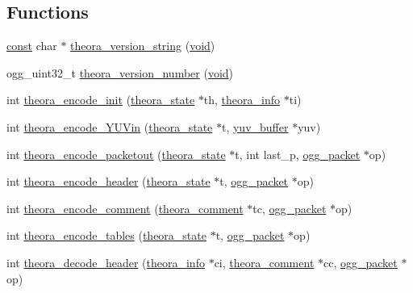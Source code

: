 \subsection*{Functions}
\begin{DoxyCompactItemize}
\item 
\hyperlink{zconf_8h_a2c212835823e3c54a8ab6d95c652660e}{const} char $\ast$ \hyperlink{group__oldfuncs_ga5a3da8fd262a60f055f96536eec06df2}{theora\+\_\+version\+\_\+string} (\hyperlink{png_8h_ac9c84fa68bbad002983e35ce3663c686}{void})
\item 
ogg\+\_\+uint32\+\_\+t \hyperlink{group__oldfuncs_gad181f4b19d455dcc2bef2533530b84c8}{theora\+\_\+version\+\_\+number} (\hyperlink{png_8h_ac9c84fa68bbad002983e35ce3663c686}{void})
\item 
int \hyperlink{group__oldfuncs_ga0f7ad4d4b2343278cb4ba8fb2bd5109a}{theora\+\_\+encode\+\_\+init} (\hyperlink{structtheora__state}{theora\+\_\+state} $\ast$th, \hyperlink{structtheora__info}{theora\+\_\+info} $\ast$ti)
\item 
int \hyperlink{group__oldfuncs_gac0d33d896ca70cedfc94c5986d947078}{theora\+\_\+encode\+\_\+\+Y\+U\+Vin} (\hyperlink{structtheora__state}{theora\+\_\+state} $\ast$t, \hyperlink{structyuv__buffer}{yuv\+\_\+buffer} $\ast$yuv)
\item 
int \hyperlink{group__oldfuncs_ga5f4929677a735bc2198c2309d235f1b3}{theora\+\_\+encode\+\_\+packetout} (\hyperlink{structtheora__state}{theora\+\_\+state} $\ast$t, int last\+\_\+p, \hyperlink{structogg__packet}{ogg\+\_\+packet} $\ast$op)
\item 
int \hyperlink{group__oldfuncs_ga451feb58d6bde726edbae193689887be}{theora\+\_\+encode\+\_\+header} (\hyperlink{structtheora__state}{theora\+\_\+state} $\ast$t, \hyperlink{structogg__packet}{ogg\+\_\+packet} $\ast$op)
\item 
int \hyperlink{group__oldfuncs_ga45e8db0713eaaca0f1144f3724cb834a}{theora\+\_\+encode\+\_\+comment} (\hyperlink{structtheora__comment}{theora\+\_\+comment} $\ast$tc, \hyperlink{structogg__packet}{ogg\+\_\+packet} $\ast$op)
\item 
int \hyperlink{group__oldfuncs_ga5085baf20855b283fa01fc948505d9d2}{theora\+\_\+encode\+\_\+tables} (\hyperlink{structtheora__state}{theora\+\_\+state} $\ast$t, \hyperlink{structogg__packet}{ogg\+\_\+packet} $\ast$op)
\item 
int \hyperlink{group__oldfuncs_ga02915e63c1bd733ee291f577a8b75a82}{theora\+\_\+decode\+\_\+header} (\hyperlink{structtheora__info}{theora\+\_\+info} $\ast$ci, \hyperlink{structtheora__comment}{theora\+\_\+comment} $\ast$cc, \hyperlink{structogg__packet}{ogg\+\_\+packet} $\ast$op)

\end{DoxyCompactItemize}
